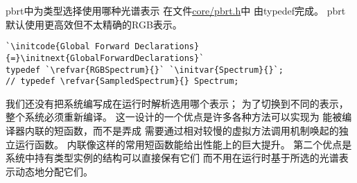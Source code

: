 pbrt中为类型选择使用哪种光谱表示
在文件\href{https://github.com/mmp/pbrt-v3/blob/master/src/core/pbrt.h}{\ttfamily core/pbrt.h}中
由{\ttfamily typedef}完成。
pbrt默认使用更高效但不太精确的RGB表示。
\begin{lstlisting}
`\initcode{Global Forward Declarations}{=}\initnext{GlobalForwardDeclarations}`
typedef `\refvar{RGBSpectrum}{}` `\initvar{Spectrum}{}`;
// typedef \refvar{SampledSpectrum}{} Spectrum;
\end{lstlisting}

我们还没有把系统编写成在运行时解析选用哪个表示；
为了切换到不同的表示，整个系统必须重新编译。
这一设计的一个优点是许多各种方法可以实现为
能被编译器内联的短函数，而不是弄成
需要通过相对较慢的虚拟方法调用机制唤起的独立运行函数。
内联像这样的常用短函数能给出性能上的巨大提升。
第二个优点是系统中持有类型实例的结构可以直接保有它们
而不用在运行时基于所选的光谱表示动态地分配它们。

